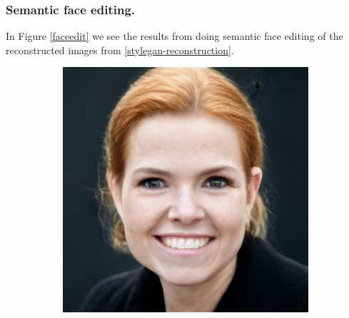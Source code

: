 \subsubsection{Semantic face editing.}

In Figure \ref{faceedit} we see the results from doing semantic face editing of the reconstructed images from
\ref{stylegan-reconstruction}.

\begin{figure}[h!]
    \centering
    \begin{subfigure}[b]{0.24\textwidth}
        \includegraphics[width=\textwidth]{fig/stylegan/faceedit/inger-smile}


\end{subfigure}
\end{figure}
